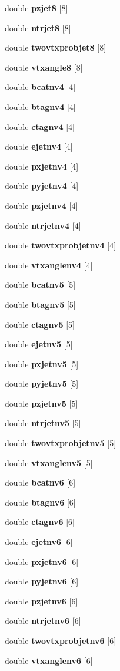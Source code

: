 \begin{DoxyCompactItemize}
double \textbf{ pzjet8} [8]
\item 
double \textbf{ ntrjet8} [8]
\item 
double \textbf{ twovtxprobjet8} [8]
\item 
double \textbf{ vtxangle8} [8]
\item 
double \textbf{ bcatnv4} [4]
\item 
double \textbf{ btagnv4} [4]
\item 
double \textbf{ ctagnv4} [4]
\item 
double \textbf{ ejetnv4} [4]
\item 
double \textbf{ pxjetnv4} [4]
\item 
double \textbf{ pyjetnv4} [4]
\item 
double \textbf{ pzjetnv4} [4]
\item 
double \textbf{ ntrjetnv4} [4]
\item 
double \textbf{ twovtxprobjetnv4} [4]
\item 
double \textbf{ vtxanglenv4} [4]
\item 
double \textbf{ bcatnv5} [5]
\item 
double \textbf{ btagnv5} [5]
\item 
double \textbf{ ctagnv5} [5]
\item 
double \textbf{ ejetnv5} [5]
\item 
double \textbf{ pxjetnv5} [5]
\item 
double \textbf{ pyjetnv5} [5]
\item 
double \textbf{ pzjetnv5} [5]
\item 
double \textbf{ ntrjetnv5} [5]
\item 
double \textbf{ twovtxprobjetnv5} [5]
\item 
double \textbf{ vtxanglenv5} [5]
\item 
double \textbf{ bcatnv6} [6]
\item 
double \textbf{ btagnv6} [6]
\item 
double \textbf{ ctagnv6} [6]
\item 
double \textbf{ ejetnv6} [6]
\item 
double \textbf{ pxjetnv6} [6]
\item 
double \textbf{ pyjetnv6} [6]
\item 
double \textbf{ pzjetnv6} [6]
\item 
double \textbf{ ntrjetnv6} [6]
\item 
double \textbf{ twovtxprobjetnv6} [6]
\item 
double \textbf{ vtxanglenv6} [6]
\item 

\end{DoxyCompactItemize}

